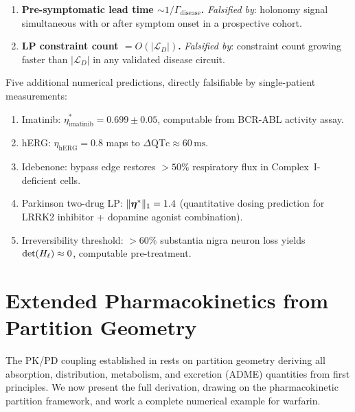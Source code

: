 \begin{enumerate}[label=\textbf{P\arabic*.}, leftmargin=3em]
\item \textbf{Pre-symptomatic lead time $\sim 1/\Gamma_{\mathrm{disease}}$.}
  \emph{Falsified by}: holonomy signal simultaneous with or after symptom
  onset in a prospective cohort.

\item \textbf{LP constraint count $= O(|\mathcal{L}_D|)$.}
  \emph{Falsified by}: constraint count growing faster than $|\mathcal{L}_D|$
  in any validated disease circuit.

\end{enumerate}

\begin{remark}
\label{rem:ch09-numerical}
Five additional numerical predictions, directly falsifiable by single-patient
measurements:
\begin{enumerate}[label=(\roman*), leftmargin=2em]
  \item Imatinib: $\eta^*_{\mathrm{imatinib}} = 0.699 \pm 0.05$, computable
    from BCR-ABL activity assay.
  \item hERG: $\eta_{\mathrm{hERG}} = 0.8$ maps to
    $\Delta\mathrm{QTc} \approx 60\,\mathrm{ms}$.
  \item Idebenone: bypass edge restores $> 50\%$ respiratory flux in
    Complex~I-deficient cells.
  \item Parkinson two-drug LP: $\|\boldsymbol{\eta}^*\|_1 = 1.4$ (quantitative dosing
    prediction for LRRK2 inhibitor + dopamine agonist combination).
  \item Irreversibility threshold: $> 60\%$ substantia nigra neuron loss
    yields $\det(H_\ell) \approx 0$, computable pre-treatment.
\end{enumerate}
\end{remark}

\section{Extended Pharmacokinetics from Partition Geometry}
\label{sec:ch09-pk-extended}

The PK/PD coupling established in  rests on partition
geometry deriving all absorption, distribution, metabolism, and excretion (ADME)
quantities from first principles.  We now present the full derivation, drawing
on the pharmacokinetic partition framework, and work a complete numerical example
for warfarin.

